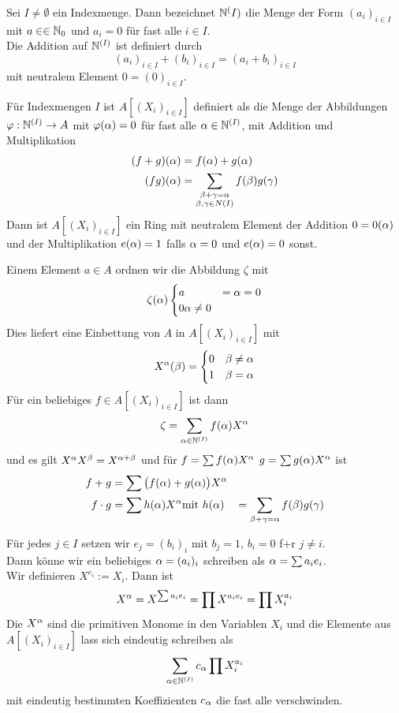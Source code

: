 	\begin{definition}
		Sei $I\neq\emptyset$ ein Indexmenge. Dann bezeichnet $\mathbb{N}^(I)$ die Menge der Form $(a_i)_{i\in I}$ mit $a\in\in\mathbb{N}_0$ und $a_i=0$ für fast alle $i\in I$.\\
		Die Addition auf $\mathbb{N}^{(I)}$ ist definiert durch
		\[(a_i)_{i\in I}+(b_i)_{i\in I}=(a_i+b_i)_{i\in I}\]
		mit neutralem Element $0=(0)_{i\in I}$.
	\end{definition}

	\begin{definition}
		Für Indexmengen $I$ ist $A[(X_i)_{i\in I}]$ definiert als die Menge der Abbildungen $\varphi:\mathbb{N}^{(I)}\to A$ mit $\varphi(\alpha)=0$ für fast alle $\alpha\in \mathbb{N}^{(I)}$, mit Addition und Multiplikation
		\begin{align*}
		(f+g)(\alpha)&=f(\alpha)+g(\alpha)\\
		(fg)(\alpha)&=\sum_{\substack{\beta+\gamma=\alpha\\\beta,\gamma\in N(I)}}f(\beta)g(\gamma)
		\end{align*}
		Dann ist $A[(X_i)_{i\in I}]$ ein Ring mit neutralem Element der Addition $0=0(\alpha)$ und der Multiplikation $e(\alpha)=1$ falls $\alpha=0$ und $e(\alpha)=0$ sonst.
	\end{definition}

	\begin{bem*}
		Einem Element $a\in A$ ordnen wir die Abbildung $\zeta$ mit \[\zeta(\alpha)\begin{cases}
		a&=\alpha=0\\
		0\alpha\neq 0
		\end{cases}\]
		Dies liefert eine Einbettung von $A$ in $A[(X_i)_{i\in I}]$ mit
		\[X^{\alpha}(\beta)=\begin{cases}
		0&\beta\neq \alpha\\
		1&\beta=\alpha
		\end{cases}\]
		Für ein beliebiges $f\in A[(X_i)_{i\in I}]$ ist dann
		\[\zeta=\sum_{\alpha\in\mathbb{N}^{(I)}}f(\alpha)X^{\alpha}\]
		und es gilt $X^{\alpha} X^\beta=X^{\alpha+\beta}$ und für $f=\sum f(\alpha)X^{\alpha}$ $g=\sum g(\alpha)X^{\alpha}$ ist
		\begin{align}
		f+g&=\sum\big(f(\alpha)+g(\alpha)\big)X^{\alpha}\\
		f\cdot g&=\sum h(\alpha)X^{\alpha}
		\text{mit }h(\alpha)&=\sum_{\beta+\gamma=\alpha}f(\beta)g(\gamma)
		\end{align}
	\end{bem*}

	\begin{bem}
		Für jedes $j\in I$ setzen wir $e_j=(b_i)_i$ mit $b_j=1$, $b_i=0$ f+r $j\neq i$.\\
		Dann könne wir ein beliebiges $\alpha=(a_i)_i$ schreiben als $\alpha=\sum a_ie_i$.\\
		Wir definieren $X^{e_i}:=X_i$. Dann ist
		\[X^{\alpha}=X^{\sum a_ie_i}=\prod X^{a_ie_i}=\prod X_i^{a_i}\]
		Die $X^{\alpha}$ sind die primitiven Monome in den Variablen $X_i$ und die Elemente aus $A[(X_i)_{i\in I}]$ lass sich eindeutig schreiben als
		\[\sum_{\alpha\in \mathbb{N}^{(I)}}c_{\alpha}\prod X_i^{a_i}\]
		mit eindeutig bestimmten Koeffizienten $c_{\alpha}$ die fast alle verschwinden.
	\end{bem}



